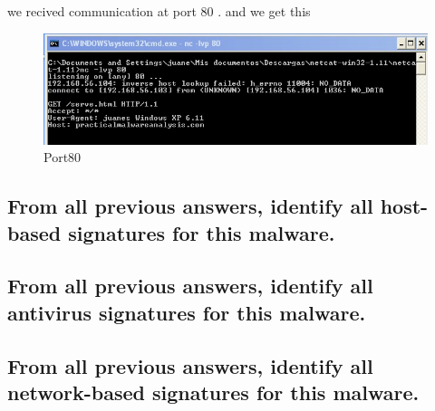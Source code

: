 \documentclass[12pt,letter]{article} %
\begin{document}
            we recived communication at port $ 80  $ . and we get this
            \begin{figure}[h!]
                \centering
                \includegraphics[width=0.6\linewidth]{port80.jpeg}
                \caption{Port80}
                \label{fig:port80}
            \end{figure}

        \subsection{From all previous answers, identify all host-based
        signatures for this malware.}

        \subsection{From all previous answers, identify all antivirus
        signatures for this malware. }

        \subsection{From all previous answers, identify all network-based
        signatures for this malware.}
\end{document}
